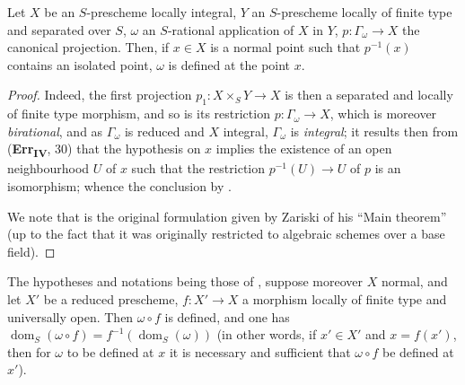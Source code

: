 \begin{proposition}[20.4.4]
\label{IV.20.4.4}
Let $X$ be an $S$-prescheme locally integral, $Y$ an $S$-prescheme locally of finite type and separated over $S$, $\omega$ an $S$-rational application of $X$ in $Y$, $p:\Gamma_\omega\to X$ the canonical projection.
Then, if $x\in X$ is a normal point such that $p^{-1}(x)$ contains an isolated point, $\omega$ is defined at the point $x$.
\end{proposition}

\begin{proof}
Indeed, the first projection $p_1:X\times_S Y\to X$ is then a separated and locally of finite type morphism, and so is its restriction $p:\Gamma_\omega\to X$, which is moreover \emph{birational}, and as $\Gamma_\omega$ is reduced and $X$ integral, $\Gamma_\omega$ is \emph{integral};
it results then from (\textbf{Err}\textsubscript{\textbf{IV}}, 30) that the hypothesis on $x$ implies the existence of an open neighbourhood $U$ of $x$ such that the restriction $p^{-1}(U)\to U$ of $p$ is an isomorphism; whence the conclusion by .

We note that  is the original formulation given by Zariski of his ``Main theorem'' (up to the fact that it was originally restricted to algebraic schemes over a base field).
\end{proof}

\begin{proposition}[20.4.5]
\label{IV.20.4.5}
The hypotheses and notations being those of , suppose moreover $X$ normal, and let $X'$ be a reduced prescheme, $f:X'\to X$ a morphism locally of finite type and universally open.
Then $\omega\circ f$ is defined, and one has $\operatorname{dom}_S(\omega\circ f)=f^{-1}(\operatorname{dom}_S(\omega))$ (in other words, if $x'\in X'$ and $x=f(x')$, then for $\omega$ to be defined at $x$ it is necessary and sufficient that $\omega\circ f$ be defined at $x'$).
\end{proposition}

